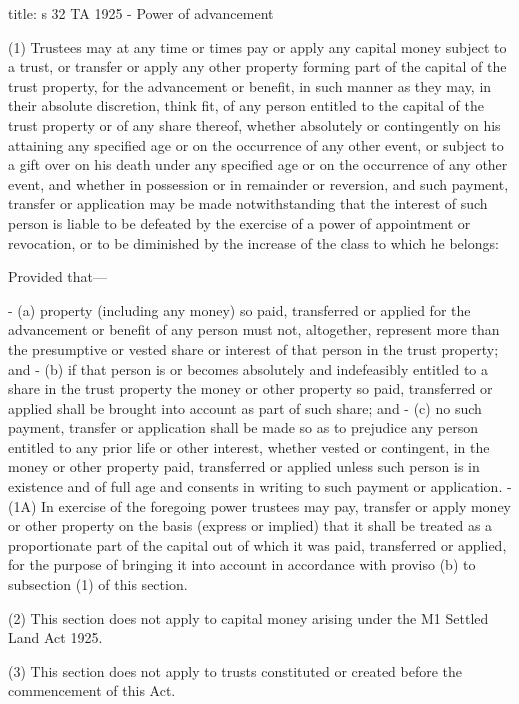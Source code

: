 \documentclass[
]{article}
\newenvironment{Shaded}{}{}
\newcommand{\NormalTok}[1]{#1}
\begin{document}
\begin{Shaded}
\begin{Highlighting}[]
\NormalTok{title: s 32 TA 1925 {-} Power of advancement}

\NormalTok{(1) Trustees may at any time or times pay or apply any capital money subject to a trust, or transfer or apply any other property forming part of the capital of the trust property, for the advancement or benefit, in such manner as they may, in their absolute discretion, think fit, of any person entitled to the capital of the trust property or of any share thereof, whether absolutely or contingently on his attaining any specified age or on the occurrence of any other event, or subject to a gift over on his death under any specified age or on the occurrence of any other event, and whether in possession or in remainder or reversion, and such payment, transfer or application may be made notwithstanding that the interest of such person is liable to be defeated by the exercise of a power of appointment or revocation, or to be diminished by the increase of the class to which he belongs:}

\NormalTok{Provided that—}

\NormalTok{{-} (a) property (including any money) so paid, transferred or applied for the advancement or benefit of any person must not, altogether, represent more than the presumptive or vested share or interest of that person in the trust property; and}
\NormalTok{{-} (b) if that person is or becomes absolutely and indefeasibly entitled to a share in the trust property the money or other property so paid, transferred or applied shall be brought into account as part of such share; and}
\NormalTok{{-} (c) no such payment, transfer or application shall be made so as to prejudice any person entitled to any prior life or other interest, whether vested or contingent, in the money or other property paid, transferred or applied unless such person is in existence and of full age and consents in writing to such payment or application.}
\NormalTok{{-} (1A) In exercise of the foregoing power trustees may pay, transfer or apply money or other property on the basis (express or implied) that it shall be treated as a proportionate part of the capital out of which it was paid, transferred or applied, for the purpose of bringing it into account in accordance with proviso (b) to subsection (1) of this section.}

\NormalTok{(2) This section does not apply to capital money arising under the M1 Settled Land Act 1925.}

\NormalTok{(3) This section does not apply to trusts constituted or created before the commencement of this Act.}
\end{Highlighting}
\end{Shaded}
\end{document}
